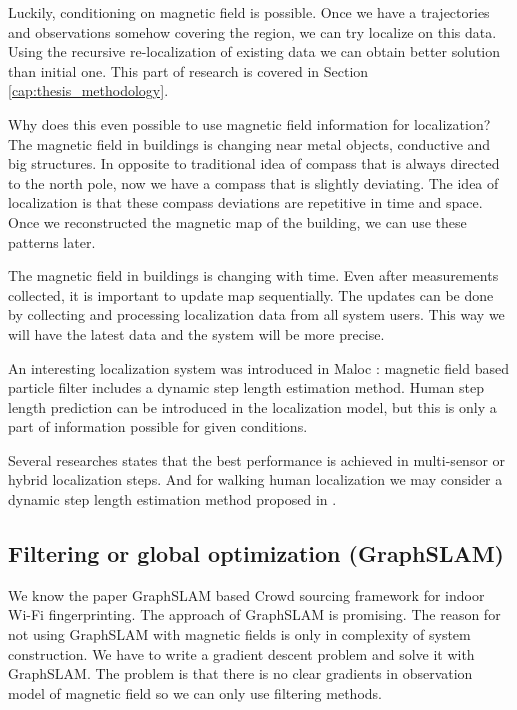 Luckily, conditioning on magnetic field is possible. Once we have a trajectories and observations somehow covering the region, we can try localize on this data. Using the recursive re-localization of existing data we can obtain better solution than initial one.
This part of research is covered in Section \ref{cap:thesis_methodology}.

Why does this even possible to use magnetic field information for localization? The magnetic field in buildings is changing near metal objects, conductive and big structures.
In opposite to traditional idea of compass that is always directed to the north pole, now we have a compass that is slightly deviating.
The idea of localization is that these compass deviations are repetitive in time and space.
Once we reconstructed the magnetic map of the building, we can use these patterns later.

The magnetic field in buildings is changing with time. Even after measurements collected, it is important to update map sequentially. The updates can be done by collecting and processing localization data from all system users. This way we will have the latest data and the system will be more precise.
 

An interesting localization system was introduced in Maloc \cite{maloc}: magnetic field based particle filter includes a dynamic step length estimation method. Human step length prediction can be introduced in the localization model, but this is only a part of information possible for given conditions.

Several researches states that the best performance is achieved in multi-sensor or hybrid localization steps. And for walking human localization we may consider a dynamic step length estimation method proposed in \cite{maloc}.

\subsection*{Filtering or global optimization (GraphSLAM)}
We know the paper GraphSLAM based Crowd sourcing framework for indoor Wi-Fi fingerprinting\cite{CrowdsourcingWiFI}. The approach of GraphSLAM is promising. 
The reason for not using GraphSLAM with magnetic fields is only in complexity of system construction. We have to write a gradient descent problem and solve it with GraphSLAM. The problem is that there is no clear gradients in observation model of magnetic field so we can only use filtering methods.

